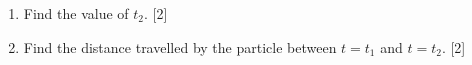 \documentclass[12pt, twoside]{article}
\begin{document}
\begin{enumerate}[itemsep=0.15cm]
\begin{enumerate}[itemsep=0.1cm]
  \item[(b)] Find the value of $t_2$. \hfill [2]
  \item[(c)] Find the distance travelled by the particle between $t = t_1$ and
  $t = t_2$. \hfill [2]
\end{enumerate}


\end{enumerate}
\end{document}
